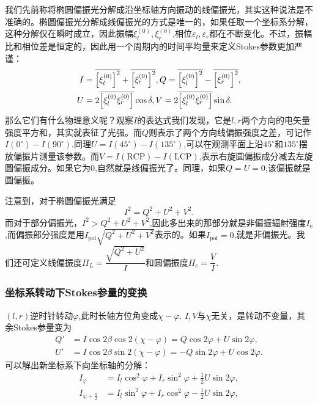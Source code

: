 \documentclass[../天体物理基础.tex]{subfiles}
\begin{document}
我们先前称将椭圆偏振光分解成沿坐标轴方向振动的线偏振光，其实这种说法是不准确的。椭圆偏振光分解成线偏振光的方式是唯一的，如果任取一个坐标系分解，这种分解仅在瞬时成立，因此振幅$\xi_{l}^{\left(0\right)},\xi_{r}^{\left(0\right)}$,相位$\varepsilon_{l},\varepsilon_{r}$都在不断变化。不过，振幅比和相位差是恒定的，因此用一个周期内的时间平均量来定义Stokes参数更加严谨：
\begin{align}
I&=\overline{\left[\xi_l^{\left(0\right)}\right]^2}+\overline{\left[\xi_r^{\left(0\right)}\right]^2},Q=\overline{\left[\xi_l^{\left(0\right)}\right]^2}-\overline{\left[\xi_r^{\left(0\right)}\right]^2},\notag\\
U&=2\overline{\left[\xi_l^{\left(0\right)}\xi_r^{\left(0\right)}\right]}\cos\delta,V=2\overline{\left[\xi_l^{\left(0\right)}\xi_r^{\left(0\right)}\right]}\sin\delta.\notag
\end{align}
那么它们有什么物理意义呢？观察$I$的表达式我们发现，它是$l,r$两个方向的电矢量强度平方和，其实就表征了光强。而$Q$则表示了两个方向线偏振强度之差，可记作$I\left(0^{\circ}\right)-I\left(90^{\circ}\right)$.同理$U=I\left(45^{\circ}\right)-I\left(135^{\circ}\right)$,可以在观测平面上沿$45^{\circ}$和$135^{\circ}$摆放偏振片测量该参数。而$V=I\left(\text{RCP}\right)-I\left(\text{LCP}\right)$,表示右旋圆偏振成分减去左旋圆偏振成分。如果它为$0$,自然就是线偏振光了。同理，如果$Q=U=0$,该偏振就是圆偏振。

注意到，对于椭圆偏振光满足
\begin{equation}
I^2=Q^2+U^2+V^2.
\end{equation}
而对于部分偏振光，$I^{2}>Q^{2}+U^{2}+V^{2}$,因此多出来的那部分就是非偏振辐射强度$I_{\text{e}}$,而偏振部分强度是用$I_{\text{pol}}\sqrt{Q^{2}+U^{2}+V^{2}}$表示的。如果$I_{\text{pol}}=0$,就是非偏振光。我们还可定义线偏振度$\Pi_L=\dfrac{\sqrt{Q^2+U^2}}{I}$和圆偏振度$\Pi_c=\dfrac{V}{I}$.

\subsubsection{坐标系转动下Stokes参量的变换}
$(l,r)$逆时针转动$\varphi$,此时长轴方位角变成$\chi-\varphi$. $I,V$与$\chi$无关，是转动不变量，其余Stokes参量变为
\begin{align}
Q'&=I\cos2\beta\cos2\left(\chi-\varphi\right)=Q\cos2\varphi+U\sin2\varphi,\\
U'&=I\cos2\beta\sin2\left(\chi-\varphi\right)=-Q\sin2\varphi+U\cos2\varphi.
\end{align}
可以解出新坐标系下向坐标轴的分解：
\begin{align}
I_\varphi&=I_l\cos^2\varphi+I_r\sin^2\varphi+\frac12U\sin2\varphi,\\
I_{\varphi+\frac\pi2}&=I_l\sin^2\varphi+I_r\cos^2\varphi-\frac12U\sin2\varphi,
\end{align}
\end{document}
